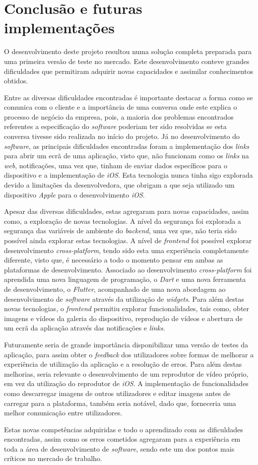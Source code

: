 \chapter{Conclusão e futuras implementações}

O desenvolvimento deste projeto resultou numa solução completa preparada para uma primeira versão de teste no mercado. Este desenvolvimento conteve grandes dificuldades que permitiram adquirir novas capacidades e assimilar conhecimentos obtidos.

Entre as diversas dificuldades encontradas é importante destacar a forma como se comunica com o cliente e a importância de uma conversa onde este explica o processo de negócio da empresa, pois, a maioria dos problemas encontrados referentes a especificação do \textit{software} poderiam ter sido resolvidas se esta conversa tivesse sido realizada no início do projeto. Já no desenvolvimento do \textit{software}, as principais dificuldades encontradas foram a implementação dos \textit{links} para abrir um ecrã de uma aplicação, visto que, não funcionam como os \textit{links} na \textit{web}, notificações, uma vez que, tinham de enviar dados específicos para o dispositivo e a implementação de \textit{iOS}. Esta tecnologia nunca tinha sigo explorada devido a limitações da desenvolvedora, que obrigam a que seja utilizado um dispositivo \textit{Apple} para o desenvolvimento \textit{iOS}.

Apesar das diversas dificuldades, estas agregaram para novas capacidades, assim como, a exploração de novas tecnologias. A nível da segurança foi explorada a segurança das variáveis de ambiente do \textit{backend}, uma vez que, não teria sido possível ainda explorar estas tecnologias. A nível de \textit{frontend} foi possível explorar desenvolvimento \textit{cross-platform}, tendo sido esta uma experiência completamente diferente, visto que, é necessário a todo o momento pensar em ambas as plataformas de desenvolvimento. Associado ao desenvolvimento \textit{cross-platform} foi aprendida uma nova linguagem de programação, o \textit{Dart} e uma nova ferramenta de desenvolvimento, o \textit{Flutter}, acompanhado de uma nova abordagem ao desenvolvimento de \textit{software} através da utilização de \textit{widgets}. Para além destas novas tecnologias, o \textit{frontend} permitiu explorar funcionalidades, tais como, obter imagens e vídeos da galeria do dispositivo, reprodução de vídeos e abertura de um ecrã da aplicação através das notificações e \textit{links}.

Futuramente seria de grande importância disponibilizar uma versão de testes da aplicação, para assim obter o \emph{feedback} dos utilizadores sobre formas de melhorar a experiência de utilização da aplicação e a resolução de erros. Para além destas melhorias, seria relevante o desenvolvimento de um reprodutor de vídeo próprio, em vez da utilização do reprodutor de \emph{iOS}. A implementação de funcionalidades como descarregar imagens de outros utilizadores e editar imagens antes de carregar para a plataforma, também seria notável, dado que, forneceria uma melhor comunicação entre utilizadores. 

Estas novas competências adquiridas e todo o aprendizado com as dificuldades encontradas, assim como os erros cometidos agregaram para a experiência em toda a área de desenvolvimento de \emph{software}, sendo este um dos pontos mais críticos no mercado de trabalho.



